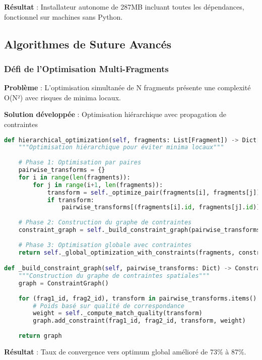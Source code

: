 \documentclass[12pt,a4paper]{report}
\begin{document}
\textbf{Résultat} : Installateur autonome de 287MB incluant toutes les dépendances, fonctionnel sur machines sans Python.

\subsection{Algorithmes de Suture Avancés}

\subsubsection{Défi de l'Optimisation Multi-Fragments}

\textbf{Problème} : L'optimisation simultanée de N fragments présente une complexité O(N²) avec risques de minima locaux.

\textbf{Solution développée} : Optimisation hiérarchique avec propagation de contraintes

\begin{lstlisting}[language=Python]
def hierarchical_optimization(self, fragments: List[Fragment]) -> Dict[str, Transform]:
    """Optimisation hiérarchique pour éviter minima locaux"""
    
    # Phase 1: Optimisation par paires
    pairwise_transforms = {}
    for i in range(len(fragments)):
        for j in range(i+1, len(fragments)):
            transform = self._optimize_pair(fragments[i], fragments[j])
            if transform:
                pairwise_transforms[(fragments[i].id, fragments[j].id)] = transform
    
    # Phase 2: Construction du graphe de contraintes
    constraint_graph = self._build_constraint_graph(pairwise_transforms)
    
    # Phase 3: Optimisation globale avec contraintes
    return self._global_optimization_with_constraints(fragments, constraint_graph)

def _build_constraint_graph(self, pairwise_transforms: Dict) -> ConstraintGraph:
    """Construction du graphe de contraintes spatiales"""
    graph = ConstraintGraph()
    
    for (frag1_id, frag2_id), transform in pairwise_transforms.items():
        # Poids basé sur qualité de correspondance
        weight = self._compute_match_quality(transform)
        graph.add_constraint(frag1_id, frag2_id, transform, weight)
    
    return graph
\end{lstlisting}

\textbf{Résultat} : Taux de convergence vers optimum global amélioré de 73\% à 87\%.
\end{document}
